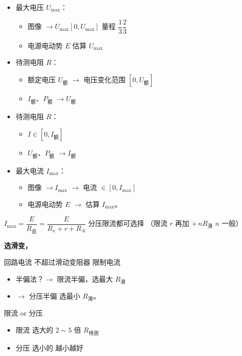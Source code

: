 \begin{itemize}
\item 最大电压 $U_{\max}$：
  \begin{itemize}
  \item 图像 $\to U_{\max}[0,U_{\max}]$ \qquad 量程 $\dfrac{1}{3}$\unclear{$\sim$}$\dfrac{2}{3}$
  \item 电源电动势 $E$ 估算 $U_{\max}$
  \end{itemize}
\item 待测电阻 $R$：
  \begin{itemize}
  \item 额定电压 $U_{\text{额}}$ $\to$ 电压变化范围 $[0,U_{\text{额}}]$
  \item $I_{\text{额}}$、$P_{\text{额}}$ $\to U_{\text{额}}$
  \end{itemize}
\item 待测电阻 $R$：
  \begin{itemize}
  \item $I\in[0,I_{\text{额}}]$
  \item $U_{\text{额}}$、$P_{\text{额}}$ $\to I_{\text{额}}$
  \end{itemize}
\item 最大电流 $I_{\max}$：
  \begin{itemize}
  \item 图像 $\to I_{\max}$ $\to$ 电流 $\in[0,I_{\max}]$
  \item 电源电动势 $E$ $\to$ 估算 $I_{\max}$。
  \end{itemize}
\end{itemize}

$I_{\max}=\dfrac{E}{R_{\text{总}}}=\dfrac{E}{R_x+r+R_A}$ \quad 分压限流都可选择 \quad （限流 $r$ 再加 $+\,nR_{\text{滑}}$ \quad $n$ 一般）

\textbf{选滑变，}

回路电流 不超过滑动变阻器 限制电流

\begin{itemize}
\item 半偏法？$\to$ 限流半偏，选最大 $R_{\text{滑}}$
\item $\to$ 分压半偏 选最小 $R_{\text{滑}}$。
\end{itemize}

限流 or 分压
\begin{itemize}
\item 限流 选大的 \qquad $2\sim5$ 倍 $R_{\text{待测}}$
\item 分压 选小的 \qquad 越小越好
\end{itemize}

